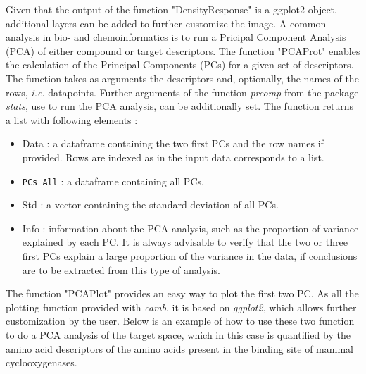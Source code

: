\documentclass[twoside,a4wide,12pt]{article}\usepackage[]{graphicx}\usepackage[]{color}
\begin{document}
Given that the output of the function "DensityResponse" is a ggplot2 object, additional layers can be added to further customize the image.
A common analysis in bio- and chemoinformatics is to run a Pricipal Component Analysis (PCA) of either compound or target descriptors. 
The function "PCAProt" enables the calculation of the Principal Components (PCs) for a given set of descriptors.
The function takes as arguments the descriptors and, optionally, the names of the rows, {\it i.e.} datapoints.
Further arguments of the function {\it prcomp} from the package {\it stats}, use to run the PCA analysis, can be additionally set.
The function returns a list with following elements :
\begin{itemize}
\item Data : a dataframe containing the two first PCs and the row names if provided. 
Rows are indexed as in the input data corresponds to a list.
\item \verb|PCs_All| : a dataframe containing all PCs.
\item Std : a vector containing the standard deviation of all PCs.
\item Info : information about the PCA analysis, such as the proportion of variance explained by each PC.
It is always advisable to verify that the two or three first PCs explain a large proportion of the variance in the data,
if conclusions are to be extracted from this type of analysis.
\end{itemize}
The function "PCAPlot" provides an easy way to plot the first two PC. 
As all the plotting function provided with {\it camb}, it is based on 
{\it ggplot2}, which allows further customization by the user.
Below is an example of how to use these two function to do a PCA analysis of the target space, 
which in this case is quantified by the amino acid descriptors of the amino acids present in the binding site
of mammal cyclooxygenases.
\end{document}
